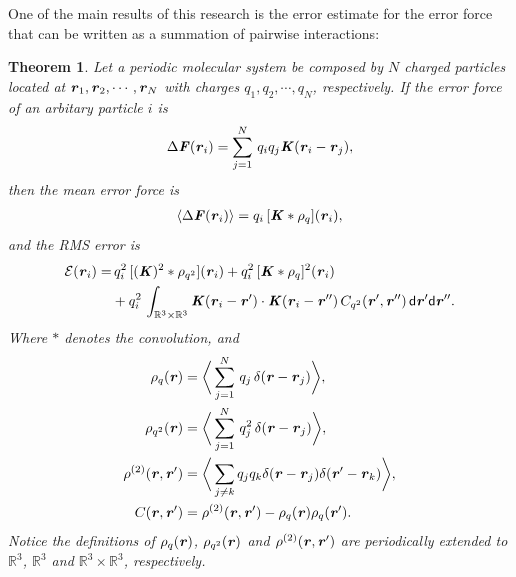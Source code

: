 \documentclass[aps,pre,preprint]{revtex4}
\renewcommand{\v}[1]{\textbf{\textit{#1}}}
\renewcommand{\d}[1]{\textsf{#1}}
\newtheorem{theorem}{Theorem}[section]
\begin{document}
One of the main results of this research is the error estimate for
the error force that can be written as a summation of
pairwise interactions:
\begin{theorem}\label{thm:tmp1}
  Let a periodic molecular system be composed by $N$ charged particles
  located at $\v r_1, \v r_2, \cdots, \v r_N$ with charges $q_1, q_2,
  \cdots, q_N$, respectively.
  If the error force of an arbitary particle $i$ is
  \begin{align}\label{eqn:thm-error-force}
    \Delta \v F(\v r_i) =
    \sum_{j=1}^N\,q_iq_j \v K(\v r_i - \v r_j),
  \end{align}
  then the mean error force is
  \begin{align}\label{eqn:thm-meanf}
    \langle\Delta\v F(\v r_i)\rangle
    =q_i\, [\v K\ast\rho_q](\v r_i),
  \end{align}
  and the RMS error is
  \begin{align}\nonumber
    \mathcal E (\v r_i) 
    = &\,
    q_i^2\,[(\v K)^2\ast\rho_{q^2}] (\v r_i) + 
    q_i^2\,[\v K\ast\rho_{q}]^2 (\v r_i) \\\label{eqn:thm-error}
    &+
    q_i^2\,\int_{\mathbb R^3\times\mathbb R^3}
    \v K(\v r_i-\v r')\cdot
    \v K(\v r_i-\v r'')\,
    C_{q^2}(\v r', \v r'')\,
    \d d\v r'\d d\v r''.
  \end{align}
  Where $\ast$ denotes the convolution, and
  \begin{align}\label{eqn:def-rhoq}
    \rho_q(\v r)
    &= 
    \bigg\langle
    \sum_{j = 1}^N
    \,q_j\,\delta(\v r - \v r_j)
    \bigg\rangle,\\\label{eqn:def-rhoq2}
    \rho_{q^2}(\v r)
    &= 
    \bigg\langle
    \sum_{j = 1}^N
    \,q^2_j\,\delta(\v r - \v r_j)
    \bigg\rangle,\\\label{eqn:def-rho2}
    \rho^{(2)}(\v r, \v r')
    &= 
    \bigg\langle
    \sum_{j\neq k}
    q_jq_k\delta(\v r-\v r_j)\delta(\v r'-\v r_k)
    \bigg\rangle,\\\label{eqn:def-c}
    C(\v r, \v r')
    &=
    \rho^{(2)}(\v r, \v r')    
    - \rho_q(\v r)\rho_q(\v r').
  \end{align}
  Notice the definitions of $\rho_q(\v r)$, $\rho_{q^2}(\v r)$ and
  $\rho^{(2)}(\v r, \v r')$ are periodically extended to
  $\mathbb{R}^3$, $\mathbb{R}^3$ and $\mathbb{R}^3\times\mathbb R^3$,
  respectively.
\end{theorem}
\end{document}
